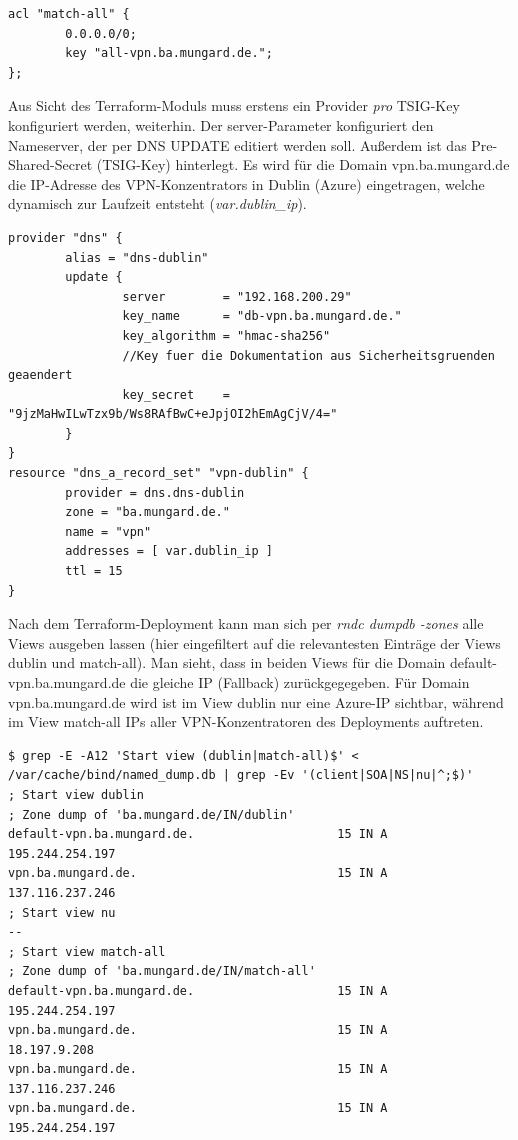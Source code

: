 \begin{lstlisting}[label=view-matchall-bind,caption=.]
acl "match-all" {
        0.0.0.0/0;
        key "all-vpn.ba.mungard.de.";
};
\end{lstlisting}


Aus Sicht des Terraform-Moduls muss erstens ein Provider \textit{pro} TSIG-Key konfiguriert werden, weiterhin. Der server-Parameter konfiguriert den Nameserver, der per DNS UPDATE editiert werden soll. Außerdem ist das Pre-Shared-Secret (TSIG-Key) hinterlegt. Es wird für die Domain vpn.ba.mungard.de die IP-Adresse des VPN-Konzentrators in Dublin (Azure) eingetragen, welche dynamisch zur Laufzeit entsteht (\textit{var.dublin\_ip}).

\begin{lstlisting}[label=tf-provider-dns,caption=.]
provider "dns" {
        alias = "dns-dublin"
        update {
                server        = "192.168.200.29"
                key_name      = "db-vpn.ba.mungard.de."
                key_algorithm = "hmac-sha256"
                //Key fuer die Dokumentation aus Sicherheitsgruenden geaendert
                key_secret    = "9jzMaHwILwTzx9b/Ws8RAfBwC+eJpjOI2hEmAgCjV/4="
        }
}
resource "dns_a_record_set" "vpn-dublin" {
        provider = dns.dns-dublin
        zone = "ba.mungard.de."
        name = "vpn"
        addresses = [ var.dublin_ip ]
        ttl = 15
}
\end{lstlisting}

Nach dem Terraform-Deployment kann man sich per \textit{rndc dumpdb -zones} alle Views ausgeben lassen (hier eingefiltert auf die relevantesten Einträge der Views \glqq dublin\grqq{} und \glqq match-all\grqq{}). Man sieht, dass in beiden Views für die Domain default-vpn.ba.mungard.de die gleiche IP (\glqq Fallback\grqq{}) zurückgegegeben. Für Domain vpn.ba.mungard.de wird ist im View \glqq dublin\grqq{} nur eine Azure-IP sichtbar, während im View \glqq match-all\grqq{} IPs aller VPN-Konzentratoren des Deployments auftreten.

\begin{lstlisting}[label=tf-provider-dns,caption=.]
$ grep -E -A12 'Start view (dublin|match-all)$' < /var/cache/bind/named_dump.db | grep -Ev '(client|SOA|NS|nu|^;$)'
; Start view dublin
; Zone dump of 'ba.mungard.de/IN/dublin'
default-vpn.ba.mungard.de.                    15 IN A           195.244.254.197
vpn.ba.mungard.de.                            15 IN A           137.116.237.246
; Start view nu
--
; Start view match-all
; Zone dump of 'ba.mungard.de/IN/match-all'
default-vpn.ba.mungard.de.                    15 IN A           195.244.254.197
vpn.ba.mungard.de.                            15 IN A           18.197.9.208
vpn.ba.mungard.de.                            15 IN A           137.116.237.246
vpn.ba.mungard.de.                            15 IN A           195.244.254.197
\end{lstlisting}

